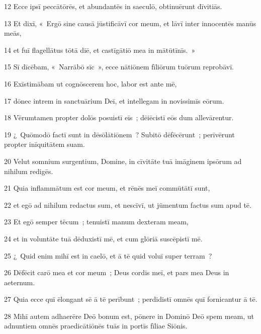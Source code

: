 \psalmVerse
  {\phantom{0}12}
  {Ecce ipsī peccātōrēs, et abundantēs in saeculō, obtinuērunt dīvitiās.}


\psalmVerse
  {\phantom{0}13}
  {Et dixī, «~Ergō sine causā jūstificāvī cor meum, et lāvī inter innocentēs manūs meās,}


\psalmVerse
  {\phantom{0}14}
  {et fuī flagellātus tōtā diē, et castīgātiō mea in mātūtīnīs.~»}


\psalmVerse
  {\phantom{0}15}
  {Sī dīcēbam, «~Narrābō sīc~», ecce nātiōnem fīliōrum tuōrum reprobāvī.}


\psalmVerse
  {\phantom{0}16}
  {Exīstimābam ut cognōscerem hoc, labor est ante mē,}


\psalmVerse
  {\phantom{0}17}
  {dōnec intrem in sanctuārium Deī, et intellegam in novissimīs eōrum.}


\psalmVerse
  {\phantom{0}18}
  {Vērumtamen propter dolōs posuistī eīs~; dēiēcistī eōs dum allevārentur.}


\psalmVerse
  {\phantom{0}19}
  {¿~Quōmodō factī sunt in dēsōlātiōnem~? Subitō dēfēcērunt~; perīvērunt propter inīquitātem suam.}


\psalmVerse
  {\phantom{0}20}
  {Velut somnium surgentium, Domine, in cīvitāte tuā imāginem ipsōrum ad nihilum redigēs.}


\psalmVerse
  {\phantom{0}21}
  {Quia inflammātum est cor meum, et rēnēs meī commūtātī sunt,}


\psalmVerse
  {\phantom{0}22}
  {et egō ad nihilum redactus sum, et nescīvī, ut jūmentum factus sum apud tē.}


\psalmVerse
  {\phantom{0}23}
  {Et egō semper tēcum~; tenuistī manum dexteram meam,}


\psalmVerse
  {\phantom{0}24}
  {et in voluntāte tuā dēduxistī mē, et cum glōriā suscēpistī mē.}


\psalmVerse
  {\phantom{0}25}
  {¿~Quid enim mihī est in caelō, et ā tē quid voluī super terram~?}


\psalmVerse
  {\phantom{0}26}
  {Dēfēcit carō mea et cor meum~; Deus cordis meī, et pars mea Deus in aeternum.}


\psalmVerse
  {\phantom{0}27}
  {Quia ecce quī ēlongant sē ā tē perībunt~; perdidistī omnēs quī fornicantur ā tē.}


\psalmVerse
  {\phantom{0}28}
  {Mihī autem adhaerēre Deō bonum est, pōnere in Dominō Deō spem meam, ut adnuntiem omnēs praedicātiōnēs tuās in portīs fīliae Siōnis.}



